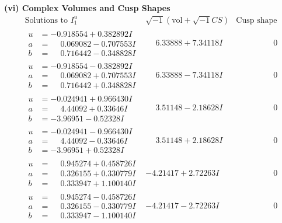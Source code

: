 \documentclass[1p]{elsarticle_modified}
\theoremstyle{definition}
\newcommand{\I}{\sqrt{-1}}
\begin{document}
\newpage\flushleft \textbf{(vi) Complex Volumes and Cusp Shapes}
$$\begin{array}{c|c|c}  
\text{Solutions to }I^u_{1}& \I (\text{vol} + \sqrt{-1}CS) & \text{Cusp shape}\\
 \hline 
\begin{aligned}
u &= -0.918554 + 0.382892 I \\
a &= \phantom{-}0.069082 - 0.707553 I \\
b &= \phantom{-}0.716442 - 0.348828 I\end{aligned}
 & \phantom{-}6.33888 + 7.34118 I & \phantom{-0.000000 } 0 \\ \hline\begin{aligned}
u &= -0.918554 - 0.382892 I \\
a &= \phantom{-}0.069082 + 0.707553 I \\
b &= \phantom{-}0.716442 + 0.348828 I\end{aligned}
 & \phantom{-}6.33888 - 7.34118 I & \phantom{-0.000000 } 0 \\ \hline\begin{aligned}
u &= -0.024941 + 0.966430 I \\
a &= \phantom{-}4.44092 + 0.33646 I \\
b &= -3.96951 - 0.52328 I\end{aligned}
 & \phantom{-}3.51148 - 2.18628 I & \phantom{-0.000000 } 0 \\ \hline\begin{aligned}
u &= -0.024941 - 0.966430 I \\
a &= \phantom{-}4.44092 - 0.33646 I \\
b &= -3.96951 + 0.52328 I\end{aligned}
 & \phantom{-}3.51148 + 2.18628 I & \phantom{-0.000000 } 0 \\ \hline\begin{aligned}
u &= \phantom{-}0.945274 + 0.458726 I \\
a &= \phantom{-}0.326155 + 0.330779 I \\
b &= \phantom{-}0.333947 + 1.100140 I\end{aligned}
 & -4.21417 + 2.72263 I & \phantom{-0.000000 } 0 \\ \hline\begin{aligned}
u &= \phantom{-}0.945274 - 0.458726 I \\
a &= \phantom{-}0.326155 - 0.330779 I \\
b &= \phantom{-}0.333947 - 1.100140 I\end{aligned}
 & -4.21417 - 2.72263 I & \phantom{-0.000000 } 0 \\ \hline\begin{aligned}

\end{aligned}
\end{array}$$
\end{document}
